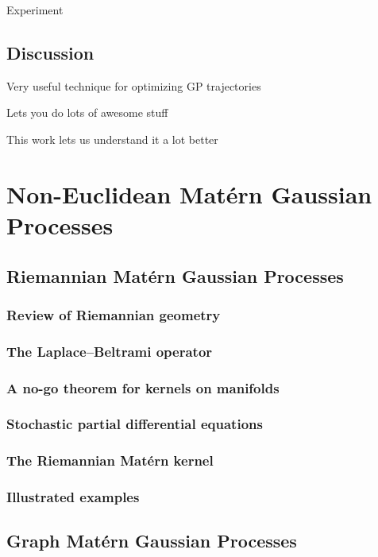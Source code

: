 \documentclass[11pt]{book}
\begin{document}
Experiment

\section{Discussion}

Very useful technique for optimizing GP trajectories

Lets you do lots of awesome stuff

This work lets us understand it a lot better





\chapter{Non-Euclidean Matérn Gaussian Processes}
\label{ch:noneuclidean}

\section{Riemannian Matérn Gaussian Processes}

\subsection{Review of Riemannian geometry}
\subsection{The Laplace--Beltrami operator}
\subsection{A no-go theorem for kernels on manifolds}
\subsection{Stochastic partial differential equations}
\subsection{The Riemannian Matérn kernel}
\subsection{Illustrated examples}

\section{Graph Matérn Gaussian Processes}
\end{document}
